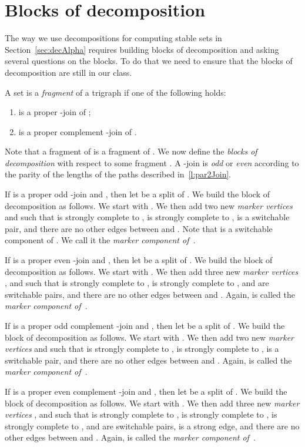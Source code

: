 \documentclass[11 pt] {article}
\begin{document}
\section{Blocks of decomposition}
\label{sec:BlockDec}

The way we use decompositions for computing stable sets in
Section~\ref{sec:decAlpha} requires building blocks of decomposition
and asking several questions on the blocks. To do that
we need to ensure that the blocks of decomposition are still in our class.
 
A set  is a \emph{fragment} of a trigraph  if
one of the following holds:
\begin{enumerate}
\item\label{i:2J}  is a proper -join of ;
\item\label{i:C2J}  is a proper complement -join of .
\end{enumerate}

Note that a fragment of  is a fragment of . We now
define the \emph{blocks of decomposition } with respect to some
fragment .  A -join is \emph{odd} or \emph{even} according to
the parity of the lengths of the paths described in~\ref{l:par2Join}.

If  is a proper odd -join and , then let
 be a split of . We build the
block of decomposition  as follows. We start with . We then add two new \emph{marker vertices} 
and  such that  is strongly complete to ,  is strongly
complete to ,  is a switchable pair, and there are no other 
edges between  and .  Note that 
is a switchable component of .  We call it the \emph{marker
  component of~}.   

If  is a proper even -join and , then let
 be a split of . We build the
block of decomposition  as follows. We start with . We then add three new \emph{marker vertices}
,  and  such that  is strongly complete to ,  is
strongly complete to ,  and  are switchable pairs, and
there are no other edges between  and .  Again,
 is called the \emph{marker component of~}.


If  is a proper odd complement -join and , then
let  be a split of . We build
the block of decomposition  as follows. We start with . We then add two new \emph{marker vertices}
 and  such that  is strongly complete to , 
is strongly complete to ,  is a switchable pair, and
there are no other edges between  and .  Again,  is called the \emph{marker component of~}.

If  is a proper even complement -join and , then
let  be a split of . We build
the block of decomposition  as follows. We start with . We then add three new \emph{marker vertices}
,  and  such that  is strongly complete to ,
 is strongly complete to ,  is strongly complete to
,  and  are switchable pairs,  is a strong edge, and
there are no other edges between  and .  Again,
 is called the \emph{marker component of~}.
\end{document}
